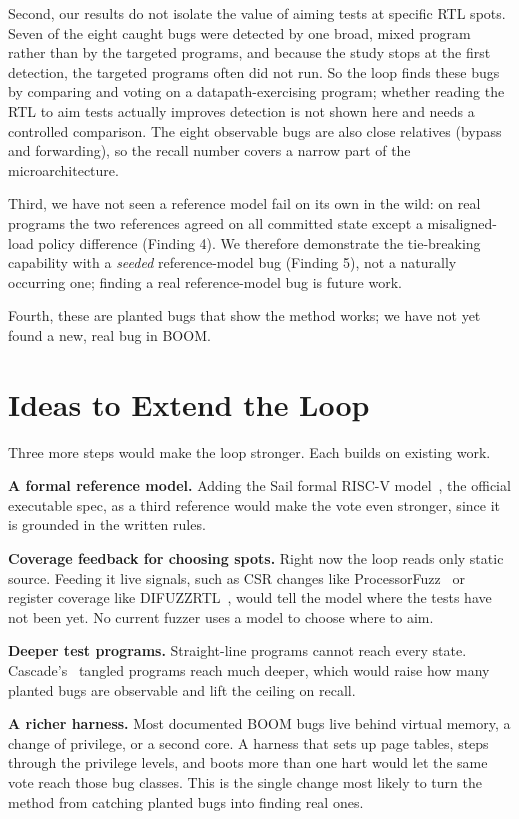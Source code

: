 \documentclass[conference]{IEEEtran}
\begin{document}
Second, our results do not isolate the value of aiming tests at specific RTL
spots. Seven of the eight caught bugs were detected by one broad, mixed program
rather than by the targeted programs, and because the study stops at the first
detection, the targeted programs often did not run. So the loop finds these bugs
by comparing and voting on a datapath-exercising program; whether reading the RTL
to aim tests actually improves detection is not shown here and needs a controlled
comparison. The eight observable bugs are also close relatives (bypass and
forwarding), so the recall number covers a narrow part of the microarchitecture.

Third, we have not seen a reference model fail on its own in the wild: on real
programs the two references agreed on all committed state except a misaligned-load
policy difference (Finding 4). We therefore demonstrate the tie-breaking
capability with a \emph{seeded} reference-model bug (Finding 5), not a naturally
occurring one; finding a real reference-model bug is future work.

Fourth, these are planted bugs that show the method works; we have not yet found
a new, real bug in BOOM.

\section{Ideas to Extend the Loop}
Three more steps would make the loop stronger. Each builds on existing work.

\textbf{A formal reference model.} Adding the Sail formal RISC-V
model~\cite{sail}, the official executable spec, as a third reference would make
the vote even stronger, since it is grounded in the written rules.

\textbf{Coverage feedback for choosing spots.} Right now the loop reads only
static source. Feeding it live signals, such as CSR changes like
ProcessorFuzz~\cite{processorfuzz} or register coverage like
DIFUZZRTL~\cite{difuzzrtl}, would tell the model where the tests have not been
yet. No current fuzzer uses a model to choose where to aim.

\textbf{Deeper test programs.} Straight-line programs cannot reach every state.
Cascade's~\cite{cascade} tangled programs reach much deeper, which would raise
how many planted bugs are observable and lift the ceiling on recall.

\textbf{A richer harness.} Most documented BOOM bugs live behind virtual memory,
a change of privilege, or a second core. A harness that sets up page tables,
steps through the privilege levels, and boots more than one hart would let the
same vote reach those bug classes. This is the single change most likely to turn
the method from catching planted bugs into finding real ones.
\end{document}
